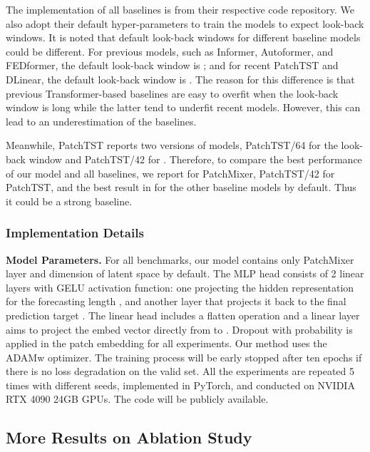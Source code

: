 \documentclass{article} \usepackage{iclr2024_conference,times}
\begin{document}
The implementation of all baselines is from their respective code repository. We also adopt their default hyper-parameters to train the models to expect look-back windows. It is noted that default look-back windows for different baseline models could be different. For previous models, such as Informer, Autoformer, and FEDformer, the default look-back window is ; and for recent PatchTST and DLinear, the default look-back window is . The reason for this difference is that previous Transformer-based baselines are easy to overfit when the look-back window is long while the latter tend to underfit recent models. However, this can lead to an underestimation of the baselines. 

Meanwhile, PatchTST\citep{patchtst} reports two versions of models, PatchTST/64 for the look-back window  and PatchTST/42 for . Therefore, to compare the best performance of our model and all baselines, we report  for PatchMixer, PatchTST/42 for PatchTST, and the best result in  for the other baseline models by default. Thus it could be a strong baseline.



\subsubsection{Implementation Details}
\label{sec::implementation details}

\textbf{Model Parameters.} For all benchmarks, our model contains only  PatchMixer layer and dimension of latent space  by default. The MLP head consists of 2 linear layers with GELU \citep{gelu} activation function: one projecting the hidden representation  for the forecasting length , and another layer that projects it back to the final prediction target . The linear head includes a flatten operation and a linear layer aims to project the embed vector directly from  to . Dropout with probability  is applied in the patch embedding for all experiments. Our method uses the ADAMw optimizer. The training process will be early stopped after ten epochs if there is no loss degradation on the valid set. All the experiments are repeated 5 times with different seeds, implemented in PyTorch, and conducted on NVIDIA RTX 4090 24GB GPUs. The code will be publicly available.





\subsection{More Results on Ablation Study}
\label{sec::more_ablation}
\end{document}
